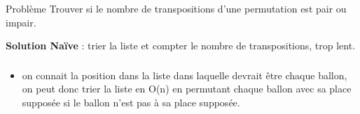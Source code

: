 \begin{frame}
    \frametitle{\problemtitle}
        \begin{block}
            {Problème} Trouver si le nombre de transpositions d'une permutation est pair ou impair.
        \end{block}
        \pause
        \textbf{Solution Naïve} : trier la liste et compter le nombre de transpositions, trop lent.
\end{frame}

\begin{frame}
    \frametitle{\problemtitle}
    \begin{itemize}
        \item<+-> on connait la position dans la liste dans laquelle devrait être chaque ballon, on peut donc trier la liste en O(n) en permutant chaque ballon avec sa place supposée si le ballon n'est pas à sa place supposée.
    \end{itemize}
\end{frame}
